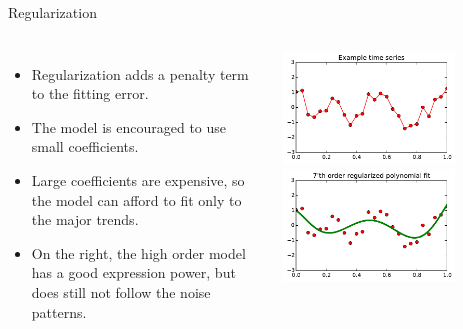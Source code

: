 \documentclass[10pt, aspectratio=169]{beamer} %
\newcommand{\leveys}{0.75\textwidth}
\begin{document}
\begin{frame}{Regularization}
\begin{columns}
\begin{itemize}
\item Regularization adds a penalty term to the fitting error.
\item The model is encouraged to use small coefficients.
\item Large coefficients are expensive, so the model can afford to fit only
to the major trends.
\item On the right, the high order model has a good expression power, but 
does still not follow the noise patterns.
\end{itemize}
\includegraphics[width=\leveys]{timeSeries.pdf}\\
\includegraphics[width=\leveys]{timeSeries_7_reg.pdf}\\

\end{columns}
\end{frame}
\end{document}
